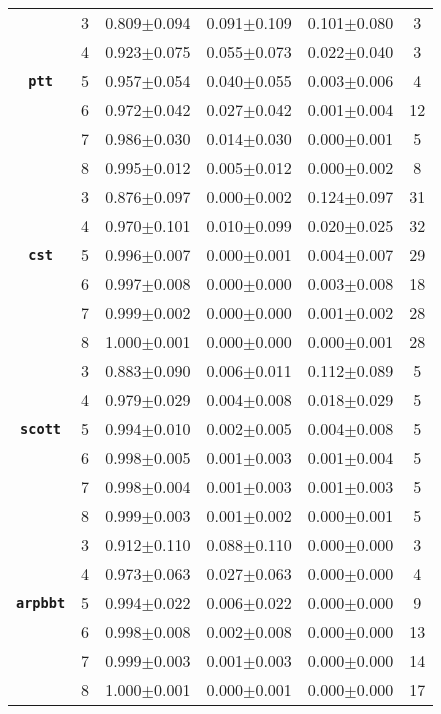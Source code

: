 \begin{table}[!ht]
\begin{tabular}{cccccc}
     \midrule
     & 3 & 0.809$\pm$0.094&	0.091$\pm$0.109&	0.101$\pm$0.080&	3\\
     & 4 & 0.923$\pm$0.075&	0.055$\pm$0.073&	0.022$\pm$0.040&	3\\
     \textbf{\texttt{ptt}}& 5 & 0.957$\pm$0.054&	0.040$\pm$0.055&	0.003$\pm$0.006&	4\\
     & 6 & 0.972$\pm$0.042&	0.027$\pm$0.042&	0.001$\pm$0.004&	12\\
     & 7 & 0.986$\pm$0.030&	0.014$\pm$0.030&	0.000$\pm$0.001&	5\\
     & 8 & 0.995$\pm$0.012&	0.005$\pm$0.012&	0.000$\pm$0.002&	8\\
     \midrule
     & 3 & 0.876$\pm$0.097&	0.000$\pm$0.002&	0.124$\pm$0.097&	31\\
     & 4 & 0.970$\pm$0.101&	0.010$\pm$0.099&	0.020$\pm$0.025&	32\\
     \textbf{\texttt{cst}}& 5 & 0.996$\pm$0.007&	0.000$\pm$0.001&	0.004$\pm$0.007&	29\\
     & 6 & 0.997$\pm$0.008&	0.000$\pm$0.000&	0.003$\pm$0.008&	18\\
     & 7 & 0.999$\pm$0.002&	0.000$\pm$0.000&	0.001$\pm$0.002&	28\\
     & 8 & 1.000$\pm$0.001&	0.000$\pm$0.000&	0.000$\pm$0.001&	28\\
     \midrule
     & 3 & 0.883$\pm$0.090&	0.006$\pm$0.011&	0.112$\pm$0.089&	5\\
     & 4 & 0.979$\pm$0.029&	0.004$\pm$0.008&	0.018$\pm$0.029&	5\\
     \textbf{\texttt{scott}}& 5 & 0.994$\pm$0.010&	0.002$\pm$0.005&	0.004$\pm$0.008&	5\\
     & 6 & 0.998$\pm$0.005&	0.001$\pm$0.003&	0.001$\pm$0.004&	5\\
     & 7 & 0.998$\pm$0.004&	0.001$\pm$0.003&	0.001$\pm$0.003&	5\\
     & 8 & 0.999$\pm$0.003&	0.001$\pm$0.002&	0.000$\pm$0.001&	5\\
     \midrule
     & 3 & 0.912$\pm$0.110&	0.088$\pm$0.110&	0.000$\pm$0.000&	3\\
     & 4 & 0.973$\pm$0.063&	0.027$\pm$0.063&	0.000$\pm$0.000&	4\\
     \textbf{\texttt{arpbbt}}& 5 & 0.994$\pm$0.022&	0.006$\pm$0.022&	0.000$\pm$0.000&	9\\
     & 6 & 0.998$\pm$0.008&	0.002$\pm$0.008&	0.000$\pm$0.000&	13\\
     & 7 & 0.999$\pm$0.003&	0.001$\pm$0.003&	0.000$\pm$0.000&	14\\
     & 8 & 1.000$\pm$0.001&	0.000$\pm$0.001&	0.000$\pm$0.000&	17\\
     \bottomrule
    \end{tabular}
\end{table}





